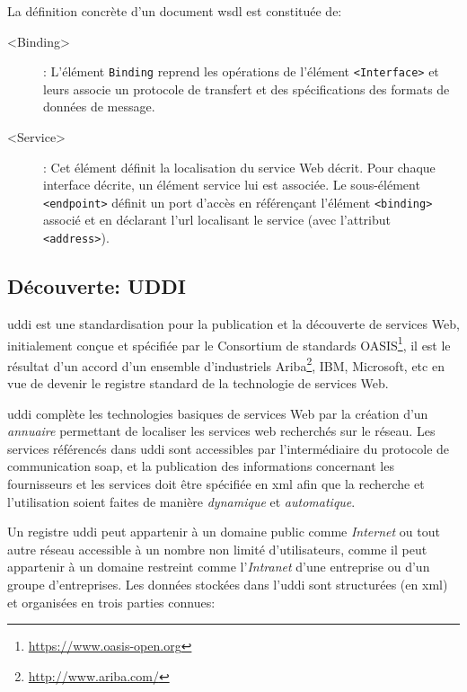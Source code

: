   La définition concrète d'un document \acrshort{wsdl} est constituée
  de:\medskip

  \renewcommand{\descriptionlabel}[1]{\hspace{0.5cm}\textbullet~\texttt{#1}}
  \begin{description}
  \item[<Binding>]: L'élément \texttt{Binding} reprend les opérations
    de l'élément \texttt{<Interface>} et leurs associe un protocole de
    transfert et des spécifications des formats de données de message.

  \item[<Service>]: Cet élément définit la localisation du service Web
    décrit. Pour chaque interface décrite, un élément service lui est
    associée. Le sous-élément \texttt{<endpoint>} définit un port
    d'accès en référençant l'élément \texttt{<binding>} associé et en
    déclarant l'\acrshort{url} localisant le service (avec l'attribut
    \texttt{<address>}).
  \end{description}

  \newpage
  \subsection{Découverte: UDDI}
  \label{sec:uddi}
  \acrshort{uddi} \cite{clement2004uddi} est une standardisation pour
  la publication et la découverte de services Web, initialement conçue
  et spécifiée par le Consortium de standards
  OASIS\footnote{\url{https://www.oasis-open.org}}, il est le résultat
  d'un accord d'un ensemble d'industriels
  Ariba\footnote{\url{http://www.ariba.com/}}, IBM, Microsoft, etc en
  vue de devenir le registre standard de la technologie de services
  Web.\medskip

  \acrshort{uddi} complète les technologies basiques de services Web
  par la création d'un \textit{annuaire} permettant de localiser
  les services web recherchés sur le réseau. Les services référencés
  dans \acrshort{uddi} sont accessibles par l'intermédiaire du
  protocole de communication \acrshort{soap}, et la publication des
  informations concernant les fournisseurs et les services doit être
  spécifiée en \acrshort{xml} afin que la recherche et l'utilisation
  soient faites de manière \textit{dynamique} et
  \textit{automatique}.\medskip

  Un registre \acrshort{uddi} peut appartenir à un domaine public
  comme \textit{Internet} ou tout autre réseau accessible à un nombre
  non limité d'utilisateurs, comme il peut appartenir à un domaine
  restreint comme l'\textit{Intranet} d'une entreprise ou d'un groupe
  d'entreprises. Les données stockées dans l'\acrshort{uddi} sont
  structurées (en \acrshort{xml}) et organisées en trois parties
  connues:\medskip

